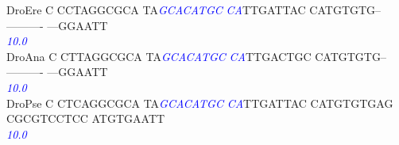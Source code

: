 \documentclass[11pt,twoside,reqno,a4paper]{article}
\begin{document}
{DroEre	C	CCTAGGCGCA	TA\textit{\textcolor{Blue}{G}}\textit{\textcolor{Blue}{C}}\textit{\textcolor{Blue}{A}}\textit{\textcolor{Blue}{C}}\textit{\textcolor{Blue}{A}}\textit{\textcolor{Blue}{T}}\textit{\textcolor{Blue}{G}}\textit{\textcolor{Blue}{C}}	\textit{\textcolor{Blue}{C}}\textit{\textcolor{Blue}{A}}TTGATTAC	CATGTGTG--	----------	---GGAATT\\
\hspace*{7\charwidth}\hspace*{1\charwidth}\hspace*{1\charwidth}\hspace*{13\charwidth}\textit{\textcolor{Blue}{10.0}}\hspace*{1\charwidth}\hspace*{1\charwidth}\hspace*{1\charwidth}\hspace*{1\charwidth}\\
DroAna	C	CTTAGGCGCA	TA\textit{\textcolor{Blue}{G}}\textit{\textcolor{Blue}{C}}\textit{\textcolor{Blue}{A}}\textit{\textcolor{Blue}{C}}\textit{\textcolor{Blue}{A}}\textit{\textcolor{Blue}{T}}\textit{\textcolor{Blue}{G}}\textit{\textcolor{Blue}{C}}	\textit{\textcolor{Blue}{C}}\textit{\textcolor{Blue}{A}}TTGACTGC	CATGTGTG--	----------	---GGAATT\\
\hspace*{7\charwidth}\hspace*{1\charwidth}\hspace*{1\charwidth}\hspace*{13\charwidth}\textit{\textcolor{Blue}{10.0}}\hspace*{1\charwidth}\hspace*{1\charwidth}\hspace*{1\charwidth}\hspace*{1\charwidth}\\
DroPse	C	CTCAGGCGCA	TA\textit{\textcolor{Blue}{G}}\textit{\textcolor{Blue}{C}}\textit{\textcolor{Blue}{A}}\textit{\textcolor{Blue}{C}}\textit{\textcolor{Blue}{A}}\textit{\textcolor{Blue}{T}}\textit{\textcolor{Blue}{G}}\textit{\textcolor{Blue}{C}}	\textit{\textcolor{Blue}{C}}\textit{\textcolor{Blue}{A}}TTGATTAC	CATGTGTGAG	CGCGTCCTCC	ATGTGAATT\\
\hspace*{7\charwidth}\hspace*{1\charwidth}\hspace*{1\charwidth}\hspace*{13\charwidth}\textit{\textcolor{Blue}{10.0}}\hspace*{1\charwidth}\hspace*{1\charwidth}\hspace*{1\charwidth}\hspace*{1\charwidth}\\
}
\end{document}
